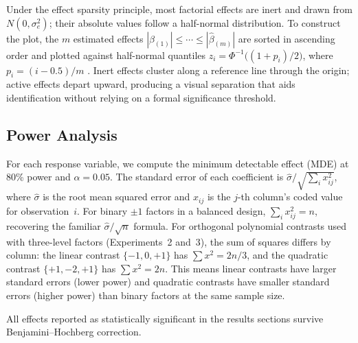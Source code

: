 Under the effect sparsity principle, most factorial effects are inert and drawn from $N(0, \sigma_e^2)$; their absolute values follow a half-normal distribution. To construct the plot, the $m$ estimated effects $|\hat{\beta}_{(1)}| \leq \cdots \leq |\hat{\beta}_{(m)}|$ are sorted in ascending order and plotted against half-normal quantiles $z_i = \Phi^{-1}\!\bigl((1 + p_i)/2\bigr)$, where $p_i = (i - 0.5)/m$ \citep{Daniel1959}. Inert effects cluster along a reference line through the origin; active effects depart upward, producing a visual separation that aids identification without relying on a formal significance threshold.

\subsection{Power Analysis}

For each response variable, we compute the minimum detectable effect (MDE) at 80\% power and $\alpha = 0.05$. The standard error of each coefficient is $\hat{\sigma} / \sqrt{\sum_i x_{ij}^2}$, where $\hat{\sigma}$ is the root mean squared error and $x_{ij}$ is the $j$-th column's coded value for observation~$i$. For binary $\pm 1$ factors in a balanced design, $\sum_i x_{ij}^2 = n$, recovering the familiar $\hat{\sigma}/\sqrt{n}$ formula. For orthogonal polynomial contrasts used with three-level factors (Experiments~2 and~3), the sum of squares differs by column: the linear contrast $\{-1, 0, +1\}$ has $\sum x^2 = 2n/3$, and the quadratic contrast $\{+1, -2, +1\}$ has $\sum x^2 = 2n$. This means linear contrasts have larger standard errors (lower power) and quadratic contrasts have smaller standard errors (higher power) than binary factors at the same sample size.

All effects reported as statistically significant in the results sections survive Benjamini--Hochberg correction.
